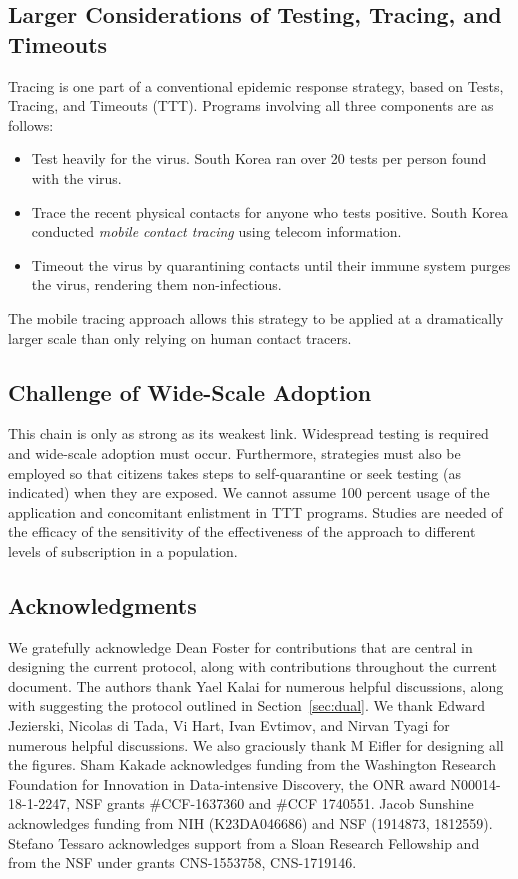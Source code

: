 \documentclass{article}
\begin{document}
\subsection{Larger Considerations of Testing, Tracing, and Timeouts}
Tracing is one part of a conventional epidemic response strategy, based on Tests, Tracing, and Timeouts (TTT). Programs involving all three components are as follows:
\begin{itemize}
\item Test heavily for the virus.  South Korea ran over 20 tests per person found with the virus. 
\item Trace the recent physical contacts for anyone who tests positive.  South Korea conducted \emph{mobile contact tracing} using telecom information.
\item Timeout the virus by quarantining contacts until their immune system purges the virus, rendering them non-infectious.
\end{itemize}
The mobile tracing approach allows this strategy to be applied at a dramatically larger scale than only relying on human contact tracers.  

\subsection{Challenge of Wide-Scale Adoption}
This chain is only as strong as its weakest link.  Widespread testing is required and wide-scale adoption must occur. Furthermore, strategies must also be employed so that citizens takes steps to self-quarantine or seek testing (as indicated) when they are exposed. We cannot assume 100 percent usage of the application and concomitant enlistment in TTT programs.  Studies are needed of the efficacy of the sensitivity of the effectiveness of the approach to different levels of subscription in a population.


\subsection*{Acknowledgments}
We gratefully acknowledge Dean Foster for contributions that are central in designing the current protocol, along with contributions throughout the current document.
The authors thank Yael Kalai for numerous helpful discussions, along with suggesting the protocol outlined in Section~\ref{sec:dual}. 
We thank Edward Jezierski, Nicolas di Tada, Vi Hart, Ivan Evtimov, and Nirvan Tyagi for numerous helpful discussions. We also graciously thank M Eifler for designing all the figures.
Sham Kakade acknowledges funding from the Washington Research
Foundation for Innovation in Data-intensive Discovery, the ONR award
N00014-18-1-2247, NSF grants \#CCF-1637360 and \#CCF 1740551. Jacob Sunshine acknowledges
funding from NIH (K23DA046686) and NSF (1914873, 1812559). Stefano Tessaro acknowledges support from a Sloan Research Fellowship and from the NSF under grants CNS-1553758, CNS-1719146.
\end{document}
